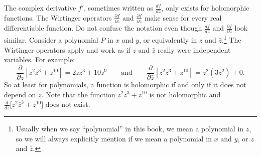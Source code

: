 \documentclass[12pt,openany]{book}
\newcommand{\myquote}[1]{``#1''}
\theoremstyle{plain}
\theoremstyle{remark}
\theoremstyle{definition}
\theoremstyle{exercise}
\theoremstyle{example}
\begin{document}
The complex derivative $f'$, sometimes written as $\frac{df}{dz}$,
only exists for holomorphic functions.
The Wirtinger operators
$\frac{\partial f}{\partial z}$ and
$\frac{\partial f}{\partial \bar{z}}$ make sense for every real differentiable
function.
Do not confuse the notation
even though $\frac{df}{dz}$ and 
$\frac{\partial f}{\partial z}$ look similar.
Consider a polynomial $P$ in $x$ and $y$, or equivalently
in $z$ and $\bar{z}$.\footnote{Usually when we say \myquote{polynomial} in this
book, we mean a polynomial in $z$, so we will always explicitly mention
if we mean a polynomial in $x$ and $y$, or $z$ and $\bar{z}$.}
The Wirtinger operators apply and
work as if $z$ and $\bar{z}$ really were independent variables.  For example:
\begin{equation*}
\frac{\partial}{\partial z}
\left[ z^2 \bar{z}^3 + z^{10} \right]
=
2z \bar{z}^3 + 10 z^{9}
\qquad
\text{and}
\qquad
\frac{\partial}{\partial \bar{z}}
\left[ z^2 \bar{z}^3 + z^{10} \right]
=
z^2 ( 3 \bar{z}^2 ) + 0 .
\end{equation*}
So at least for polynomials, a function is holomorphic 
if and only if it does not depend on $\bar{z}$.
Note that
the function $z^2 \bar{z}^3 + z^{10}$ is not holomorphic
and
$\frac{d}{dz} \bigl[ z^2 \bar{z}^3 + z^{10} \bigr]$
does not exist.
\end{document}
